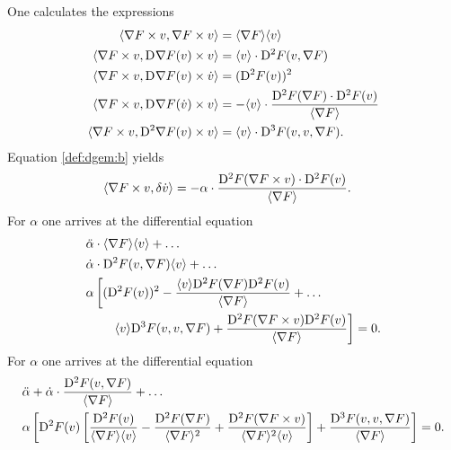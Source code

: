 One calculates the expressions
\begin{subequations}
    \begin{align}
        \langle  \nabla F  \times v ,  \nabla F  \times v  \rangle  &=
        \langle  \nabla F   \rangle \langle  v  \rangle\\
        \langle  \nabla F  \times v ,  \mathrm{D}^{  } \nabla F  ( v ) \times v  \rangle  &=
        \langle  v  \rangle \cdot \mathrm{D}^{ 2 } F ( v, \nabla F  )\\
        \langle  \nabla F  \times v ,  \mathrm{D}^{  } \nabla F  ( v ) \times \dot{ v }  \rangle  &=
        ( \mathrm{D}^{ 2 } F ( v ) )^2\\
        \langle  \nabla F  \times v ,  \mathrm{D}^{  } \nabla F  ( \dot{ v } ) \times v  \rangle  &=
        -  \langle  v  \rangle \cdot \frac{ \mathrm{D}^{ 2 } F ( \nabla F  ) \cdot \mathrm{D}^{ 2 } F ( v ) }{ \langle  \nabla F   \rangle }\\
        \langle  \nabla F  \times v ,  \mathrm{D}^{ 2 } \nabla F  ( v ) \times v  \rangle  &=
        \langle  v  \rangle \cdot \mathrm{D}^{ 3 } F ( v, v, \nabla F  ) .
    \end{align}
\end{subequations}
Equation \eqref{def:dgem:b} yields
\begin{align}
    \langle  \nabla F  \times v ,  \delta \dot{ v }  \rangle  &=
    -\alpha \cdot \frac{ \mathrm{D}^{ 2 } F ( \nabla F  \times v ) \cdot \mathrm{D}^{ 2 } F ( v ) }{ \langle  \nabla F   \rangle } .
\end{align}
For $ \alpha $ one arrives at the differential equation
\begin{align}
    &\ddot{ \alpha } \cdot \langle  \nabla F   \rangle \langle  v  \rangle  +  \dots\nonumber\\
    &\dot{ \alpha } \cdot \mathrm{D}^{ 2 } F ( v, \nabla F  ) \langle  v  \rangle  +  \dots\nonumber\\
    &\alpha \left[ ( \mathrm{D}^{ 2 } F ( v ) )^2  -
    \frac{ \langle  v  \rangle \mathrm{D}^{ 2 } F ( \nabla F  ) \mathrm{D}^{ 2 } F ( v ) }{ \langle  \nabla F   \rangle }  +  \dots\right.\nonumber\\
    &\qquad\left.\langle  v  \rangle \mathrm{D}^{ 3 } F ( v, v, \nabla F  )  +
    \frac{ \mathrm{D}^{ 2 } F ( \nabla F  \times v ) \mathrm{D}^{ 2 } F ( v ) }{ \langle  \nabla F   \rangle } \right]  =  0 .
\end{align}
For $ \alpha $ one arrives at the differential equation
\begin{align}
    &\ddot{ \alpha }  +
    \dot{ \alpha } \cdot \frac{ \mathrm{D}^{ 2 } F ( v, \nabla F  ) }
    { \langle  \nabla F   \rangle }  +  \dots\nonumber\\
    &\alpha \left[ \mathrm{D}^{ 2 } F ( v ) \left[ \frac{ \mathrm{D}^{ 2 } F ( v ) }{ \langle  \nabla F   \rangle \langle  v  \rangle }  -
    \frac{ \mathrm{D}^{ 2 } F ( \nabla F  ) }{ \langle  \nabla F   \rangle^2 }  +
    \frac{ \mathrm{D}^{ 2 } F ( \nabla F  \times v ) }{ \langle  \nabla F   \rangle^2 \langle  v  \rangle } \right]  +
    \frac{ \mathrm{D}^{ 3 } F ( v, v, \nabla F  ) }{ \langle  \nabla F   \rangle } \right]  =  0 .
\end{align}

